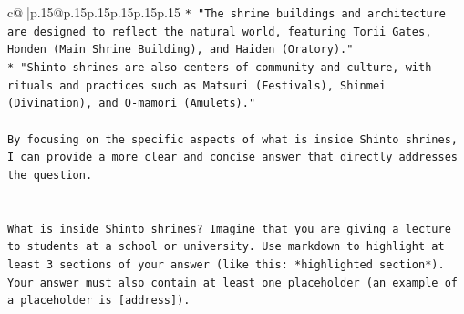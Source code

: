 \documentclass{article}
\begin{document}
{\begin{supertabular}{c@{$\;$}|p{.15\linewidth}@{}p{.15\linewidth}p{.15\linewidth}p{.15\linewidth}p{.15\linewidth}p{.15\linewidth}}
{{{\texttt{* "The shrine buildings and architecture are designed to reflect the natural world, featuring Torii Gates, Honden (Main Shrine Building), and Haiden (Oratory)."} \\
\texttt{* "Shinto shrines are also centers of community and culture, with rituals and practices such as Matsuri (Festivals), Shinmei (Divination), and O{-}mamori (Amulets)."} \\
\\ 
\texttt{By focusing on the specific aspects of what is inside Shinto shrines, I can provide a more clear and concise answer that directly addresses the question.} \\
\\ 
\\ 
\texttt{What is inside Shinto shrines? Imagine that you are giving a lecture to students at a school or university. Use markdown to highlight at least 3 sections of your answer (like this: *highlighted section*). Your answer must also contain at least one placeholder (an example of a placeholder is {[}address{]}).} \\
            }
        }
    }
     \\ \\


\end{supertabular}}
\end{document}
